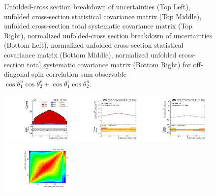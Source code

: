 \begin{figure}[htb]
\begin{center}
\caption{Unfolded-cross section breakdown of uncertainties (Top Left), unfolded cross-section statistical covariance matrix (Top Middle), unfolded cross-section total systematic covariance matrix (Top Right), normalized unfolded-cross section breakdown of uncertainties (Bottom Left), normalized unfolded cross-section statistical covariance matrix (Bottom Middle), normalized unfolded cross-section total systematic covariance matrix (Bottom Right) for off-diagonal spin correlation sum observable $\cos\theta_{1}^{n}\cos\theta_{2}^{r}+\cos\theta_{1}^{r}\cos\theta_{2}^{n}$.}
\label{fig:c_Pnr_uncertainties}
\end{center}
\end{figure}
\clearpage
\begin{figure}[htb]
\begin{center}
 \includegraphics[width=0.32\textwidth]{fig_fullRun2UL/controlplots/combined/Hyp_LLBarCMnr.pdf}
 \includegraphics[width=0.32\textwidth]{fig_fullRun2UL/unfolding/combined/UnfoldedResults_c_Mnr.pdf}
 \includegraphics[width=0.32\textwidth]{fig_fullRun2UL/unfolding/combined/UnfoldedResultsNorm_c_Mnr.pdf} \\
 \includegraphics[width=0.32\textwidth]{fig_fullRun2UL/unfolding/combined/ResponseMatrix_c_Mnr.pdf}

\end{center}
\end{figure}
